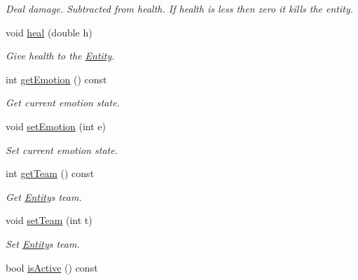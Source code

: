 \begin{DoxyCompactItemize}
\begin{DoxyCompactList}\small\item\em Deal damage. Subtracted from health. If health is less then zero it kills the entity. \end{DoxyCompactList}\item 
void \hyperlink{classEntity_aef00fa78f66829c0ecb8c27c65bd3a92}{heal} (double h)\hypertarget{classEntity_aef00fa78f66829c0ecb8c27c65bd3a92}{}\label{classEntity_aef00fa78f66829c0ecb8c27c65bd3a92}

\begin{DoxyCompactList}\small\item\em Give health to the \hyperlink{classEntity}{Entity}. \end{DoxyCompactList}\item 
int \hyperlink{classEntity_af1e50595c209b7c90fc9e98ce93883d4}{get\+Emotion} () const \hypertarget{classEntity_af1e50595c209b7c90fc9e98ce93883d4}{}\label{classEntity_af1e50595c209b7c90fc9e98ce93883d4}

\begin{DoxyCompactList}\small\item\em Get current emotion state. \end{DoxyCompactList}\item 
void \hyperlink{classEntity_a79056ef5d580c09fe6cf34b989b14589}{set\+Emotion} (int e)\hypertarget{classEntity_a79056ef5d580c09fe6cf34b989b14589}{}\label{classEntity_a79056ef5d580c09fe6cf34b989b14589}

\begin{DoxyCompactList}\small\item\em Set current emotion state. \end{DoxyCompactList}\item 
int \hyperlink{classEntity_a413d08d1c89b90286c39ec0476613abf}{get\+Team} () const \hypertarget{classEntity_a413d08d1c89b90286c39ec0476613abf}{}\label{classEntity_a413d08d1c89b90286c39ec0476613abf}

\begin{DoxyCompactList}\small\item\em Get \hyperlink{classEntity}{Entity}\textquotesingle{}s team. \end{DoxyCompactList}\item 
void \hyperlink{classEntity_a9fe88f82909f89087ad17d4d7ce6b22e}{set\+Team} (int t)\hypertarget{classEntity_a9fe88f82909f89087ad17d4d7ce6b22e}{}\label{classEntity_a9fe88f82909f89087ad17d4d7ce6b22e}

\begin{DoxyCompactList}\small\item\em Set \hyperlink{classEntity}{Entity}\textquotesingle{}s team. \end{DoxyCompactList}\item 
bool \hyperlink{classEntity_a6b9926025e54639201b59b447da5365b}{is\+Active} () const \hypertarget{classEntity_a6b9926025e54639201b59b447da5365b}{}\label{classEntity_a6b9926025e54639201b59b447da5365b}


\end{DoxyCompactItemize}
